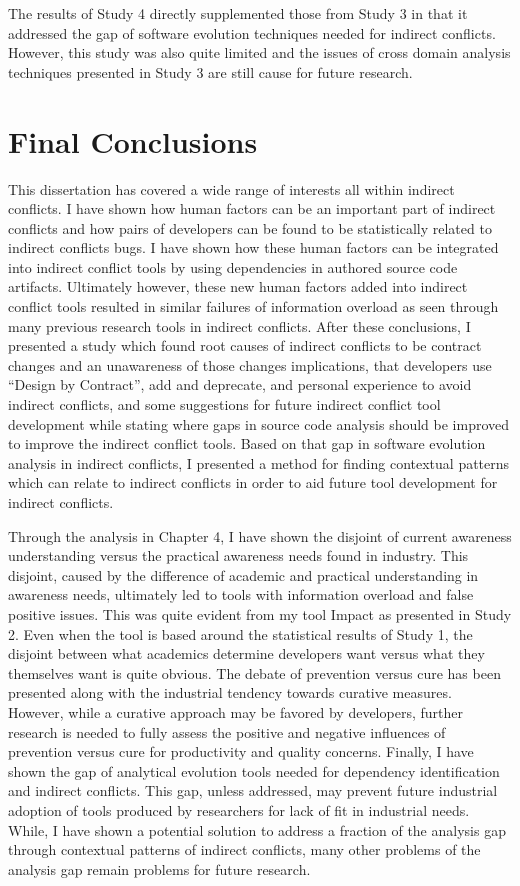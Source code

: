 The results of Study 4 directly supplemented those from Study 3 in that it addressed the gap of software evolution techniques
needed for indirect conflicts. However, this study was also quite limited and the issues of cross domain analysis techniques
presented in Study 3 are still cause for future research.

\section{Final Conclusions}

This dissertation has covered a wide range of interests all within indirect conflicts. I have shown how human factors can
be an important part of indirect conflicts and how pairs of developers can be found to be statistically related to indirect
conflicts bugs. I have shown how these human factors can be integrated into indirect conflict tools by using dependencies in 
authored source code artifacts. Ultimately however, these new human factors added into indirect conflict tools resulted in
similar failures of information overload as seen through many previous research tools in indirect conflicts. After these conclusions,
I presented a study which found root causes of indirect conflicts to be contract changes and an unawareness of those changes
implications, that developers use ``Design by Contract'', add and deprecate, and personal experience to avoid indirect conflicts,
and some suggestions for future indirect conflict tool development while stating where gaps in source code analysis should
be improved to improve the indirect conflict tools. Based on that gap in
software evolution analysis in indirect conflicts, I presented a method for finding contextual patterns which can relate to
indirect conflicts in order to aid future tool development for indirect conflicts.


Through the analysis in Chapter 4, I have shown the disjoint of current awareness understanding versus the practical
awareness needs found in industry. This disjoint, caused by the difference of academic and practical understanding in awareness needs,
ultimately led to tools with information overload and false positive issues. This was quite evident from my tool Impact as
presented in Study 2. Even when the tool is based around the statistical results of Study 1, the disjoint between what academics
determine developers want versus what they themselves want is quite obvious. The debate of prevention versus cure has been presented along with
the industrial tendency towards curative measures. However, while a curative approach may be favored by developers, further research is needed
to fully assess the positive and negative influences of prevention versus cure for productivity and quality concerns. Finally, I have shown
the gap of analytical evolution tools needed for dependency identification and indirect conflicts. This gap, unless addressed, may prevent
future industrial adoption of tools produced by researchers for lack of fit in industrial needs. While, I have shown a potential solution to address
a fraction of the analysis gap through contextual patterns of indirect conflicts, many other problems of the analysis gap remain problems
for future research.
